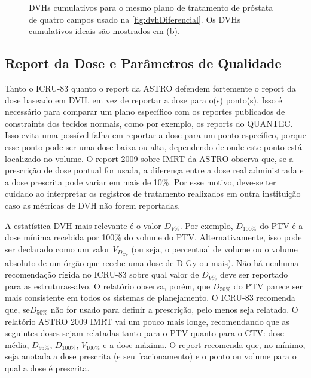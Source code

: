 \documentclass[11pt,a4paper]{article}
\newcounter{exemplo}
\begin{document}
\begin{figure}[h]
    \centering
    \caption{DVHs cumulativos para o mesmo plano de tratamento de próstata de quatro campos usado na \ref{fig:dvhDiferencial}. Os DVHs cumulativos ideais são mostrados em (b).}
    \label{fig:dvhCumulativo}
\end{figure}

\subsection*{Report da Dose e Parâmetros de Qualidade}

	Tanto o ICRU-83 quanto o report da ASTRO defendem fortemente o report da dose baseado em DVH, em vez de reportar a dose para o(s) ponto(s). Isso é necessário para comparar um plano específico com os reportes publicados de constraints dos tecidos normais, como por exemplo, os reports do QUANTEC. Isso evita uma possível falha em reportar a dose para um ponto específico, porque esse ponto pode ser uma dose baixa ou alta, dependendo de onde este ponto está localizado no volume. O report 2009 sobre IMRT da ASTRO observa que, se a prescrição de dose pontual for usada, a diferença entre a dose real administrada e a dose prescrita pode variar em mais de 10\%. Por esse motivo, deve-se ter cuidado ao interpretar os registros de tratamento realizados em outra instituição caso as métricas de DVH não forem reportadas.

	A estatística DVH mais relevante é o valor $D_{V\%}$. Por exemplo,  $D_{100\%}$ do PTV é a dose mínima recebida por 100\% do volume do PTV. Alternativamente, isso pode ser declarado como um valor $V_{D_{Gy}}$ (ou seja, o percentual de volume ou o volume absoluto de um órgão que recebe uma dose de D Gy ou mais). Não há nenhuma recomendação rígida no ICRU-83 sobre qual valor de $D_{V\%}$ deve ser reportado para as estruturas-alvo. O relatório observa, porém, que $D_{50\%}$ do PTV parece ser mais consistente em todos os sistemas de planejamento. O ICRU-83 recomenda que, se$D_{50\%}$ não for usado para definir a prescrição, pelo menos seja relatado. O relatório ASTRO 2009 IMRT vai um pouco mais longe, recomendando que as seguintes doses sejam relatadas tanto para o PTV quanto para o CTV: dose média, $D_{95\%}$, $D_{100\%}$, $V_{100\%}$ e a dose máxima. O report recomenda que, no mínimo, seja anotada a dose prescrita (e seu fracionamento) e o ponto ou volume para o qual a dose é prescrita.
\end{document}
